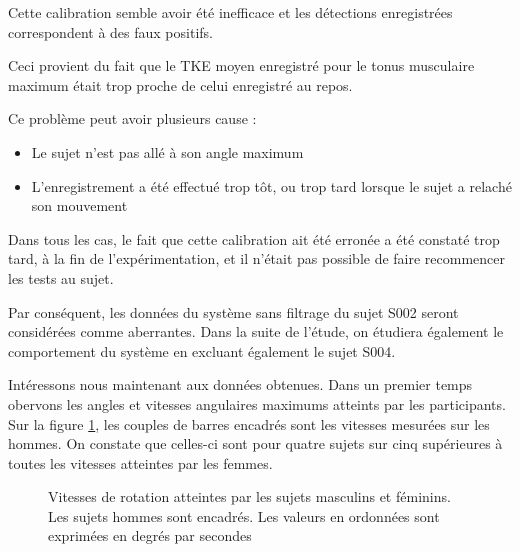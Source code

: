 \documentclass[letterpaper, twoside, 12pt, memoire, creativecommons, hyperref]{thETS}
\begin{document}
Cette calibration semble avoir été inefficace et les détections enregistrées correspondent à des faux positifs. 


Ceci provient du fait que le TKE moyen enregistré pour le tonus musculaire maximum était trop proche de celui enregistré au repos. 

Ce problème peut avoir plusieurs cause : 

\begin{itemize}
 \item Le sujet n'est pas allé à son angle maximum
 \item L'enregistrement a été effectué trop tôt, ou trop tard lorsque le sujet a relaché son mouvement
\end{itemize}

Dans tous les cas, le fait que cette calibration ait été erronée a été constaté trop tard, à la fin de l'expérimentation, et il n'était pas possible de faire recommencer les tests au sujet.

Par conséquent, les données du système sans filtrage du sujet S002 seront considérées comme aberrantes. Dans la suite de l'étude, on étudiera également le comportement du système en excluant également le sujet S004.

Intéressons nous maintenant aux données obtenues. Dans un premier temps obervons les angles et vitesses angulaires maximums atteints par les participants. Sur la figure \ref{fig:vitesseshommes}, les couples de barres encadrés sont les vitesses mesurées sur les hommes. On constate que celles-ci sont pour quatre sujets sur cinq supérieures à toutes les vitesses atteintes par les femmes. 

\begin{figure}
	\centering
	\caption{Vitesses de rotation atteintes par les sujets masculins et féminins. Les sujets hommes sont encadrés. Les valeurs en ordonnées sont exprimées en degrés par secondes}
	\label{fig:vitesseshommes}
\end{figure}
\end{document}
